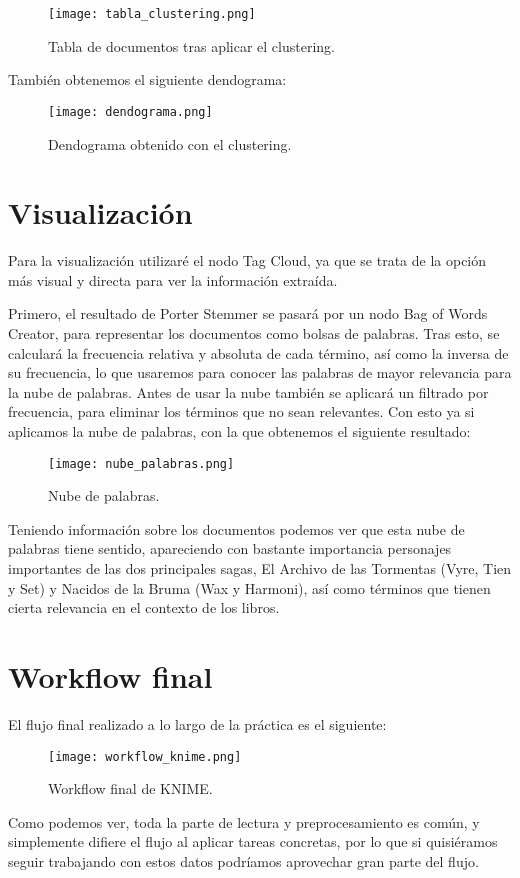 \begin{figure}[H]
	\centering
	\texttt{[image: tabla\_clustering.png]}
	\caption{Tabla de documentos tras aplicar el clustering.}
	\label{fig:tabla_clustering}
\end{figure}

También obtenemos el siguiente dendograma:

\begin{figure}[H]
	\centering
	\texttt{[image: dendograma.png]}
	\caption{Dendograma obtenido con el clustering.}
	\label{fig:dendograma}
\end{figure}


\section{Visualización}

Para la visualización utilizaré el nodo Tag Cloud, ya que se trata de la opción más visual y directa para ver la información extraída.

Primero, el resultado de Porter Stemmer se pasará por un nodo Bag of Words Creator, para representar los documentos como bolsas de palabras. Tras esto, se calculará la frecuencia relativa y absoluta de cada término, así como la inversa de su frecuencia, lo que usaremos para conocer las palabras de mayor relevancia para la nube de palabras. Antes de usar la nube también se aplicará un filtrado por frecuencia, para eliminar los términos que no sean relevantes. Con esto ya si aplicamos la nube de palabras, con la que obtenemos el siguiente resultado:


\begin{figure}[H]
	\centering
	\texttt{[image: nube\_palabras.png]}
	\caption{Nube de palabras.}
	\label{fig:nube_palabras}
\end{figure}

Teniendo información sobre los documentos podemos ver que esta nube de palabras tiene sentido, apareciendo con bastante importancia personajes importantes de las dos principales sagas, El Archivo de las Tormentas (Vyre, Tien y Set) y Nacidos de la Bruma (Wax y Harmoni), así como términos que tienen cierta relevancia en el contexto de los libros.

\section{Workflow final}


El flujo final realizado a lo largo de la práctica es el siguiente:

\begin{figure}[H]
	\centering
	\texttt{[image: workflow\_knime.png]}
	\caption{Workflow final de KNIME.}
	\label{fig:workflow_knime}
\end{figure}


Como podemos ver, toda la parte de lectura y preprocesamiento es común, y simplemente difiere el flujo al aplicar tareas concretas, por lo que si quisiéramos seguir trabajando con estos datos podríamos aprovechar gran parte del flujo.
